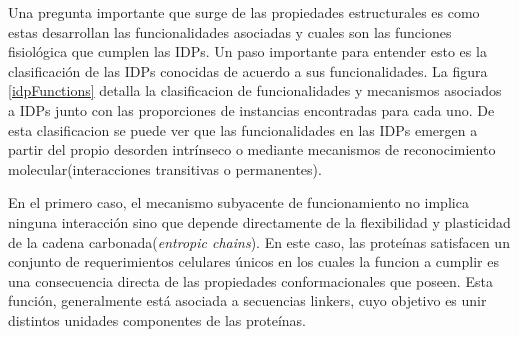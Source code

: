 Una pregunta importante que surge de las propiedades estructurales es como estas desarrollan las funcionalidades asociadas y cuales son las funciones fisiológica que cumplen las IDPs.
Un paso importante para entender esto es la clasificación de las IDPs conocidas de acuerdo a sus funcionalidades\cite{van2014classification}.
La figura \ref{idpFunctions} detalla la clasificacion de funcionalidades y mecanismos asociados a IDPs junto con las proporciones de instancias encontradas para cada uno.
De esta clasificacion se puede ver que las funcionalidades en las IDPs emergen a partir del propio desorden intrínseco o mediante mecanismos de reconocimiento molecular(interacciones transitivas o permanentes).

En el primero caso, el mecanismo subyacente de funcionamiento no implica ninguna interacción sino que depende directamente de la flexibilidad y plasticidad de la cadena carbonada(\textit{entropic chains}).
En este caso, las proteínas satisfacen un conjunto de requerimientos celulares únicos en los cuales la funcion a cumplir es una consecuencia directa de las propiedades conformacionales que poseen. 
Esta función, generalmente está asociada a secuencias linkers, cuyo objetivo es unir distintos unidades componentes de las proteínas.

